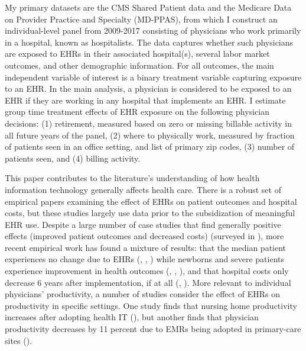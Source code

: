 \documentclass[11pt]{article}
\begin{document}
My primary datasets are the CMS Shared Patient data and the Medicare Data on Provider Practice and Specialty (MD-PPAS), from which I construct an individual-level panel from 2009-2017 consisting of physicians who work primarily in a hospital, known as hospitalists. The data captures whether such physicians are exposed to EHRs in their associated hospital(s), several labor market outcomes, and other demographic information. For all outcomes, the main independent variable of interest is a binary treatment variable capturing exposure to an EHR. In the main analysis, a physician is considered to be exposed to an EHR if they are working in any hospital that implements an EHR. I estimate group time treatment effects of EHR exposure on the following physician decisions: (1) retirement, measured based on zero or missing billable activity in all future years of the panel, (2) where to physically work, measured by fraction of patients seen in an office setting, and list of primary zip codes, (3) number of patients seen, and (4) billing activity. 

This paper contributes to the literature's understanding of how health information technology generally affects health care. There is a robust set of empirical papers examining the effect of EHRs on patient outcomes and hospital costs, but these studies largely use data prior to the subsidization of meaningful EHR use. Despite a large number of case studies that find generally positive effects (improved patient outcomes and decreased costs) (surveyed in \cite{Buntin2011TheResults}), more recent empirical work has found a mixture of results: that the median patient experiences no change due to EHRs (\cite{Agha2014TheCare}, \cite{McCullough2016HealthCoordination}, \cite{Meyerhoefer}) while newborns and severe patients experience improvement in health outcomes (\cite{Miller2009}, \cite{Freedman2015}, \cite{McCullough2016HealthCoordination}), and that hospital costs only decrease 6 years after implementation, if at all (\cite{Agha2014TheCare}, \cite{dranove2014trillion}). More relevant to individual physicians' productivity, a number of studies consider the effect of EHRs on productivity in specific settings. One study finds that nursing home productivity increases after adopting health IT (\cite{Hitt2016}), but another finds that physician productivity decreases by 11 percent due to EMRs being adopted in primary-care sites (\cite{Meyerhoefer}).  
\end{document}
